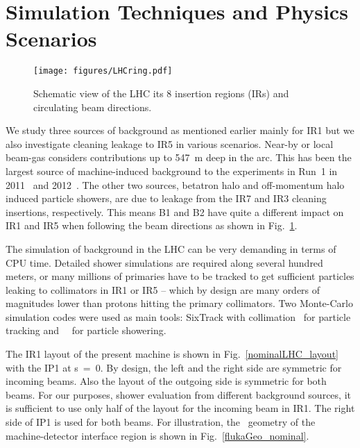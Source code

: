 \section{Simulation Techniques and Physics Scenarios\label{simSetup}}


\begin{figure}%
\begin{center}
\texttt{[image: figures/LHCring.pdf]}
\end{center}
\vspace{-0.6cm}
 \caption{Schematic view of the LHC its 8 insertion regions (IRs) and circulating beam directions.
  \label{LHCring}}
\end{figure}

We study three sources of background as mentioned earlier mainly for IR1 but we also investigate cleaning leakage to IR5 in various scenarios. Near-by or local beam-gas considers contributions up to 547~m deep in the arc. This has been the largest source of machine-induced background to the experiments in Run~1 in 2011~\cite{nimPaperRod} and 2012~\cite{atlasBKGPaper2012}. The other two sources, betatron halo and off-momentum halo induced particle showers, are due to leakage from the IR7 and IR3 cleaning insertions, respectively. This means B1 and B2 have quite a different impact on IR1 and IR5 when following the beam directions as shown in Fig.~\ref{LHCring}.

The simulation of background in the LHC can be very demanding in terms of CPU time. Detailed shower simulations are required along several hundred meters, or many millions of primaries have to be tracked to get sufficient particles leaking to collimators in IR1 or IR5 -- which by design are many orders of magnitudes lower than protons hitting the primary collimators. Two Monte-Carlo simulation codes were used as main tools: SixTrack with collimation~\cite{SixTrackRef} for particle tracking and \fluka~\cite{flukaRef1,flukaRef2}~for particle showering.

The IR1 layout of the present machine is shown in Fig.~\ref{nominalLHC_layout} with the IP1 at s~=~0. By design, the left and the right side are symmetric for incoming beams. Also the layout of the outgoing side is symmetric for both beams. For our purposes, shower evaluation from different background sources, it is sufficient to use only half of the layout for the incoming beam in IR1. The right side of IP1 is used for both beams. For illustration, the \fluka~geometry of the machine-detector interface region is shown in Fig.~\ref{flukaGeo_nominal}.


